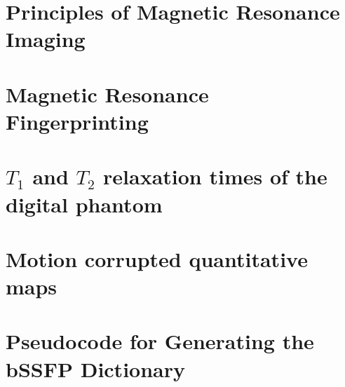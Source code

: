 
\appendix
\chapter{Principles of Magnetic Resonance Imaging}
\label{appendixlabelBackgroundMRI}
 

\chapter{Magnetic Resonance Fingerprinting}
\label{appendixlabelBackgroundMRF}
 

\chapter{$T_1$ and $T_2$ relaxation times of the digital phantom}
\label{appendixlabelPhantom}
 

\chapter{Motion corrupted quantitative maps}
\label{appendixlabelMotion}


\chapter{Pseudocode for Generating the bSSFP Dictionary}
\label{appendixlabel1}
 
 





